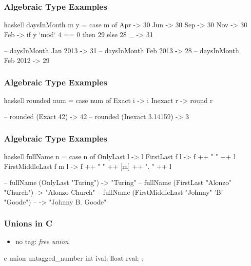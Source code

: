 \documentclass[dvipsnames]{beamer}
\theoremstyle{plain}
\begin{document}
\begin{frame}[fragile]
  \frametitle{Algebraic Type Examples}

  \begin{example}
    \begin{pygments}{haskell}
daysInMonth m y =
    case m of
      Apr -> 30
      Jun -> 30
      Sep -> 30
      Nov -> 30
      Feb -> if y `mod` 4 == 0 then 29 else 28
      _ -> 31

-- daysInMonth Jan 2013 -> 31
-- daysInMonth Feb 2013 -> 28
-- daysInMonth Feb 2012 -> 29
    \end{pygments}
  \end{example}
\end{frame}

\begin{frame}[fragile]
  \frametitle{Algebraic Type Examples}

  \begin{example}
    \begin{pygments}{haskell}
rounded num =
    case num of
      Exact i -> i
      Inexact r -> round r

-- rounded (Exact 42) -> 42
-- rounded (Inexact 3.14159) -> 3
    \end{pygments}
  \end{example}
\end{frame}

\begin{frame}[fragile]
  \frametitle{Algebraic Type Examples}

  \begin{example}
    \begin{pygments}{haskell}
fullName n =
    case n of
      OnlyLast l -> l
      FirstLast f l -> f ++ " " ++ l
      FirstMiddleLast f m l -> f ++ " " ++ [m] ++ ". " ++ l

-- fullName (OnlyLast "Turing") -> "Turing"
-- fullName (FirstLast "Alonzo" "Church") -> "Alonzo Church"
-- fullName (FirstMiddleLast "Johnny" 'B' "Goode")
--     -> "Johnny B. Goode"
    \end{pygments}
  \end{example}
\end{frame}

\begin{frame}[fragile]
  \frametitle{Unions in C}

  \begin{itemize}
    \item no tag: \emph{free union}
  \end{itemize}

  \begin{example}
    \begin{pygments}{c}
union untagged_number {
    int ival;
    float rval;
};
    \end{pygments}
  \end{example}
\end{frame}
\end{document}
